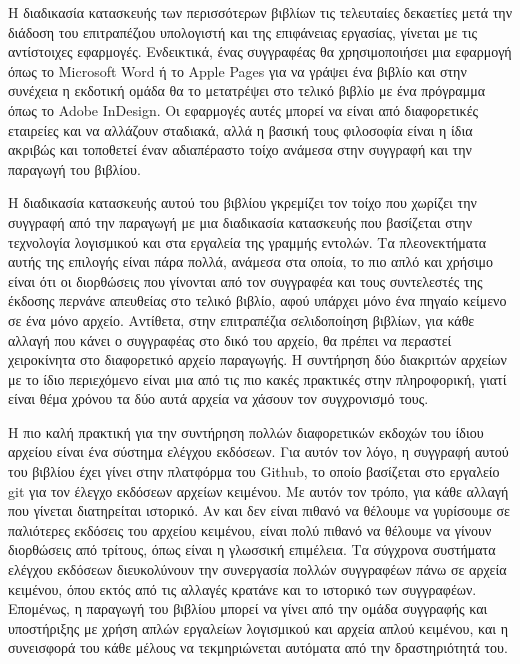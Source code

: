 \documentclass[
]{article}
\begin{document}
Η διαδικασία κατασκευής των περισσότερων βιβλίων τις τελευταίες
δεκαετίες μετά την διάδοση του επιτραπέζιου υπολογιστή και της
επιφάνειας εργασίας, γίνεται με τις αντίστοιχες εφαρμογές. Ενδεικτικά,
ένας συγγραφέας θα χρησιμοποιήσει μια εφαρμογή όπως το Microsoft Word ή
το Apple Pages για να γράψει ένα βιβλίο και στην συνέχεια η εκδοτική
ομάδα θα το μετατρέψει στο τελικό βιβλίο με ένα πρόγραμμα όπως το Adobe
InDesign. Οι εφαρμογές αυτές μπορεί να είναι από διαφορετικές εταιρείες
και να αλλάζουν σταδιακά, αλλά η βασική τους φιλοσοφία είναι η ίδια
ακριβώς και τοποθετεί έναν αδιαπέραστο τοίχο ανάμεσα στην συγγραφή και
την παραγωγή του βιβλίου.

Η διαδικασία κατασκευής αυτού του βιβλίου γκρεμίζει τον τοίχο που
χωρίζει την συγγραφή από την παραγωγή με μια διαδικασία κατασκευής που
βασίζεται στην τεχνολογία λογισμικού και στα εργαλεία της γραμμής
εντολών. Τα πλεονεκτήματα αυτής της επιλογής είναι πάρα πολλά, ανάμεσα
στα οποία, το πιο απλό και χρήσιμο είναι ότι οι διορθώσεις που γίνονται
από τον συγγραφέα και τους συντελεστές της έκδοσης περνάνε απευθείας στο
τελικό βιβλίο, αφού υπάρχει μόνο ένα πηγαίο κείμενο σε ένα μόνο αρχείο.
Αντίθετα, στην επιτραπέζια σελιδοποίηση βιβλίων, για κάθε αλλαγή που
κάνει ο συγγραφέας στο δικό του αρχείο, θα πρέπει να περαστεί
χειροκίνητα στο διαφορετικό αρχείο παραγωγής. Η συντήρηση δύο διακριτών
αρχείων με το ίδιο περιεχόμενο είναι μια από τις πιο κακές πρακτικές
στην πληροφορική, γιατί είναι θέμα χρόνου τα δύο αυτά αρχεία να χάσουν
τον συγχρονισμό τους.

Η πιο καλή πρακτική για την συντήρηση πολλών διαφορετικών εκδοχών του
ίδιου αρχείου είναι ένα σύστημα ελέγχου εκδόσεων. Για αυτόν τον λόγο, η
συγγραφή αυτού του βιβλίου έχει γίνει στην πλατφόρμα του Github, το
οποίο βασίζεται στο εργαλείο git για τον έλεγχο εκδόσεων αρχείων
κειμένου. Με αυτόν τον τρόπο, για κάθε αλλαγή που γίνεται διατηρείται
ιστορικό. Αν και δεν είναι πιθανό να θέλουμε να γυρίσουμε σε παλιότερες
εκδόσεις του αρχείου κειμένου, είναι πολύ πιθανό να θέλουμε να γίνουν
διορθώσεις από τρίτους, όπως είναι η γλωσσική επιμέλεια. Τα σύγχρονα
συστήματα ελέγχου εκδόσεων διευκολύνουν την συνεργασία πολλών συγγραφέων
πάνω σε αρχεία κειμένου, όπου εκτός από τις αλλαγές κρατάνε και το
ιστορικό των συγγραφέων. Επομένως, η παραγωγή του βιβλίου μπορεί να
γίνει από την ομάδα συγγραφής και υποστήριξης με χρήση απλών εργαλείων
λογισμικού και αρχεία απλού κειμένου, και η συνεισφορά του κάθε μέλους
να τεκμηριώνεται αυτόματα από την δραστηριότητά του.
\end{document}
